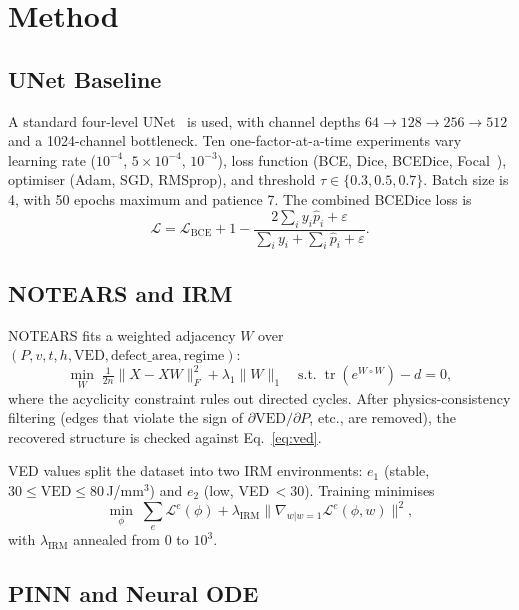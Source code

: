 \documentclass[10pt,twocolumn]{article}
\begin{document}
\section{Method}

\subsection{UNet Baseline}

A standard four-level UNet~\cite{ronneberger2015} is used, with
channel depths $64\to128\to256\to512$ and a 1024-channel bottleneck.
Ten one-factor-at-a-time experiments vary learning rate
($10^{-4}$, $5\times10^{-4}$, $10^{-3}$), loss function (BCE, Dice,
BCEDice, Focal~\cite{lin2017}), optimiser (Adam, SGD, RMSprop), and
threshold $\tau\in\{0.3,0.5,0.7\}$. Batch size is 4, with 50 epochs
maximum and patience 7. The combined BCEDice loss is
\begin{equation}
  \mathcal{L} = \mathcal{L}_{\text{BCE}}
  + 1 - \frac{2\sum_i y_i\hat{p}_i + \varepsilon}
             {\sum_i y_i + \sum_i \hat{p}_i + \varepsilon}.
\end{equation}

\subsection{NOTEARS and IRM}

NOTEARS fits a weighted adjacency $W$ over
$(P, v, t, h, \text{VED}, \text{defect\_area}, \text{regime})$:
\begin{equation}
  \min_{W}\;\tfrac{1}{2n}\|X-XW\|_F^2 + \lambda_1\|W\|_1
  \quad \text{s.t.}\; \operatorname{tr}(e^{W\circ W}) - d = 0,
\end{equation}
where the acyclicity constraint rules out directed cycles.
After physics-consistency filtering (edges that violate the sign of
$\partial\text{VED}/\partial P$, etc., are removed), the recovered
structure is checked against Eq.~\eqref{eq:ved}.

VED values split the dataset into two IRM environments:
$e_1$ (stable, $30\leq\text{VED}\leq80$\,J/mm$^3$) and
$e_2$ (low, VED\,$<30$). Training minimises
\begin{equation}
  \min_{\phi}\;\sum_e \mathcal{L}^e(\phi)
  + \lambda_{\text{IRM}}
  \bigl\|\nabla_{w|w=1}\mathcal{L}^e(\phi,w)\bigr\|^2,
\end{equation}
with $\lambda_{\text{IRM}}$ annealed from $0$ to $10^3$.

\subsection{PINN and Neural ODE}
\end{document}
